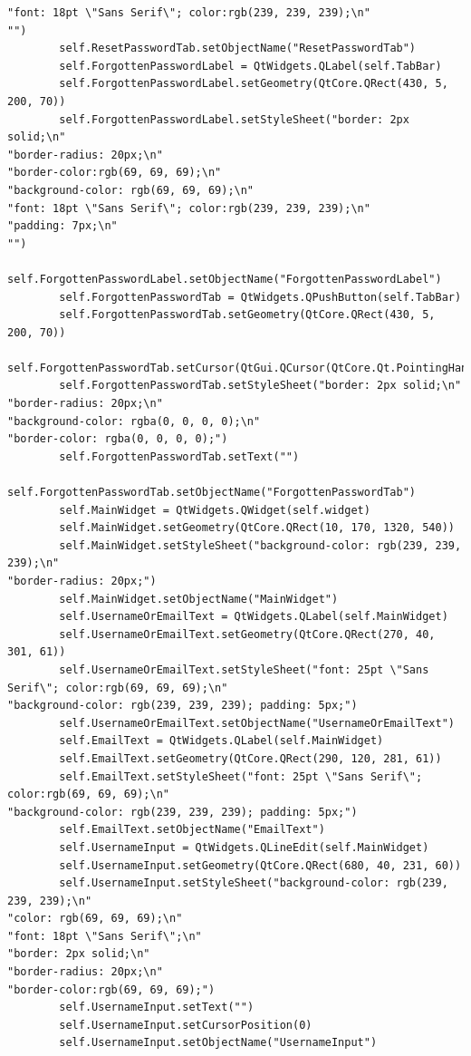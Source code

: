 \documentclass[12pt]{article}
\begin{document}
\begin{lstlisting}
"font: 18pt \"Sans Serif\"; color:rgb(239, 239, 239);\n"
"")
        self.ResetPasswordTab.setObjectName("ResetPasswordTab")
        self.ForgottenPasswordLabel = QtWidgets.QLabel(self.TabBar)
        self.ForgottenPasswordLabel.setGeometry(QtCore.QRect(430, 5, 200, 70))
        self.ForgottenPasswordLabel.setStyleSheet("border: 2px solid;\n"
"border-radius: 20px;\n"
"border-color:rgb(69, 69, 69);\n"
"background-color: rgb(69, 69, 69);\n"
"font: 18pt \"Sans Serif\"; color:rgb(239, 239, 239);\n"
"padding: 7px;\n"
"")
        self.ForgottenPasswordLabel.setObjectName("ForgottenPasswordLabel")
        self.ForgottenPasswordTab = QtWidgets.QPushButton(self.TabBar)
        self.ForgottenPasswordTab.setGeometry(QtCore.QRect(430, 5, 200, 70))
        self.ForgottenPasswordTab.setCursor(QtGui.QCursor(QtCore.Qt.PointingHandCursor))
        self.ForgottenPasswordTab.setStyleSheet("border: 2px solid;\n"
"border-radius: 20px;\n"
"background-color: rgba(0, 0, 0, 0);\n"
"border-color: rgba(0, 0, 0, 0);")
        self.ForgottenPasswordTab.setText("")
        self.ForgottenPasswordTab.setObjectName("ForgottenPasswordTab")
        self.MainWidget = QtWidgets.QWidget(self.widget)
        self.MainWidget.setGeometry(QtCore.QRect(10, 170, 1320, 540))
        self.MainWidget.setStyleSheet("background-color: rgb(239, 239, 239);\n"
"border-radius: 20px;")
        self.MainWidget.setObjectName("MainWidget")
        self.UsernameOrEmailText = QtWidgets.QLabel(self.MainWidget)
        self.UsernameOrEmailText.setGeometry(QtCore.QRect(270, 40, 301, 61))
        self.UsernameOrEmailText.setStyleSheet("font: 25pt \"Sans Serif\"; color:rgb(69, 69, 69);\n"
"background-color: rgb(239, 239, 239); padding: 5px;")
        self.UsernameOrEmailText.setObjectName("UsernameOrEmailText")
        self.EmailText = QtWidgets.QLabel(self.MainWidget)
        self.EmailText.setGeometry(QtCore.QRect(290, 120, 281, 61))
        self.EmailText.setStyleSheet("font: 25pt \"Sans Serif\"; color:rgb(69, 69, 69);\n"
"background-color: rgb(239, 239, 239); padding: 5px;")
        self.EmailText.setObjectName("EmailText")
        self.UsernameInput = QtWidgets.QLineEdit(self.MainWidget)
        self.UsernameInput.setGeometry(QtCore.QRect(680, 40, 231, 60))
        self.UsernameInput.setStyleSheet("background-color: rgb(239, 239, 239);\n"
"color: rgb(69, 69, 69);\n"
"font: 18pt \"Sans Serif\";\n"
"border: 2px solid;\n"
"border-radius: 20px;\n"
"border-color:rgb(69, 69, 69);")
        self.UsernameInput.setText("")
        self.UsernameInput.setCursorPosition(0)
        self.UsernameInput.setObjectName("UsernameInput")

\end{lstlisting}
\end{document}

